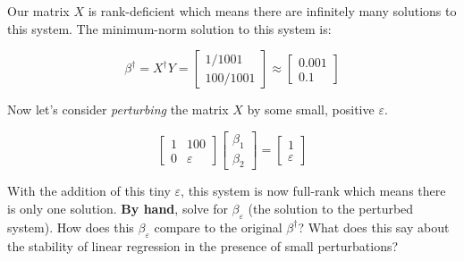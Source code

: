 \documentclass[12pt,letterpaper]{article}
\begin{document}
Our matrix $X$ is rank-deficient which means there are infinitely many solutions to this system. The minimum-norm solution to this system is: 

$$ \beta^\dagger = X^\dagger Y = \begin{bmatrix} 1/1001 \\ 100 / 1001 \end{bmatrix} \approx \begin{bmatrix} 0.001 \\ 0.1 \end{bmatrix} $$ 

Now let's consider \textit{perturbing} the matrix $X$ by some small, positive $\varepsilon$. 

$$ \begin{bmatrix} 1 & 100 \\ 0 & \varepsilon \end{bmatrix} \begin{bmatrix} \beta_1 \\ \beta_2 \end{bmatrix} = \begin{bmatrix} 1 \\ \varepsilon \end{bmatrix} $$ 

With the addition of this tiny $\varepsilon$, this system is now full-rank which means there is only one solution. \textbf{By hand}, solve for $\beta_\varepsilon$ (the solution to the perturbed system). How does this $\beta_\varepsilon$ compare to the original $\beta^\dagger$? What does this say about the stability of linear regression in the presence of small perturbations?
\end{document}
